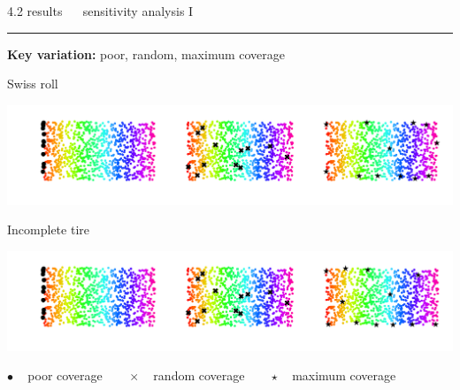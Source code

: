 \documentclass[11pt, compress, t, notes = noshow, xcolor = table, 
aspectratio = 1610]{beamer}
\begin{document}

\LARGE
\begin{frame}{\textcolor{gray!90}{4.2 results} ~~ sensitivity analysis I}
\normalsize
\vspace{-0.5cm}
\noindent \textcolor{gray!90}{\rule{\textwidth}{1pt}}
\smallskip

\textbf{Key variation:} poor, random, maximum coverage

\vspace{0.3cm}

\begin{minipage}[c]{0.2\textwidth}
  Swiss roll
\end{minipage}%
\begin{minipage}[c]{0.8\textwidth}
  \includegraphics[trim = 40 20 0 0, clip, %
    width = \textwidth]{figures/sensitivity_landmarks_key_swiss_roll}
\end{minipage}

\vspace{0.3cm}   

\begin{minipage}[c]{0.2\textwidth}
  Incomplete tire
\end{minipage}%
\begin{minipage}[c]{0.8\textwidth}
  \includegraphics[trim = 40 20 0 0, clip, %
    width = \textwidth]{figures/sensitivity_landmarks_key_incomplete_tire}
\end{minipage}

\vfill

\scriptsize
$\bullet$ ~ poor coverage ~~~ $\bm{\times}$ ~ random coverage ~~~
$\star$ ~ maximum coverage

\end{frame}

\end{document}
